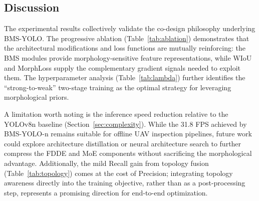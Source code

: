 \subsection{Discussion}

The experimental results collectively validate the co-design philosophy underlying BMS-YOLO. The progressive ablation (Table~\ref{tab:ablation}) demonstrates that the architectural modifications and loss functions are mutually reinforcing: the BMS modules provide morphology-sensitive feature representations, while WIoU and MorphLoss supply the complementary gradient signals needed to exploit them. The hyperparameter analysis (Table~\ref{tab:lambda}) further identifies the ``strong-to-weak'' two-stage training as the optimal strategy for leveraging morphological priors.

A limitation worth noting is the inference speed reduction relative to the YOLOv8n baseline (Section~\ref{sec:complexity}). While the 31.8 FPS achieved by BMS-YOLO-n remains suitable for offline UAV inspection pipelines, future work could explore architecture distillation or neural architecture search to further compress the FDDE and MoE components without sacrificing the morphological advantage. Additionally, the mild Recall gain from topology fusion (Table~\ref{tab:topology}) comes at the cost of Precision; integrating topology awareness directly into the training objective, rather than as a post-processing step, represents a promising direction for end-to-end optimization.
